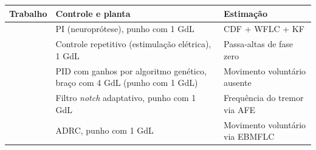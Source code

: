 \small
\begin{tabularx}{\textwidth}{
    l
    >{\raggedright\arraybackslash\hsize=1.2\hsize}X
    >{\raggedright\arraybackslash\hsize=0.8\hsize}X
}
    \toprule
    Trabalho & Controle e planta & Estimação \\
    \midrule
    \textcite{Gallego:2013} & PI (neuroprótese), punho com 1 GdL & CDF + WFLC + KF \\\midrule
    \textcite{Copur:2019} & Controle repetitivo (estimulação elétrica), 1 GdL & Passa-altas de fase zero \\\midrule
    \textcite{Lekshmi:2019} & PID com ganhos por algoritmo genético, braço com 4 GdL (punho com 1 GdL) & Movimento voluntário ausente \\\midrule
    \textcite{Zamanian:2019} & Filtro \textit{notch} adaptativo, punho com 1 GdL & Frequência do tremor via AFE \\\midrule
    \textcite{Qi:2024} & ADRC, punho com 1 GdL & Movimento voluntário via EBMFLC \\
    \bottomrule
\end{tabularx}
